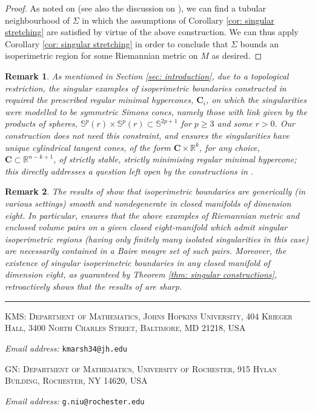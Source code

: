 \documentclass[12pt]{article}
\makeatletter
\newtheorem{remark}{Remark}
\newcommand{\Addresses}{{
  \bigskip
  \footnotesize

KMS:
\textsc{Department of Mathematics, Johns Hopkins University, 404 Krieger Hall, 3400 North Charles Street, Baltimore, MD 21218, USA}\par\nopagebreak
  \textit{Email address:} \texttt{kmarsh34@jh.edu}

\bigskip

GN:
\textsc{Department of Mathematics, University of Rochester, 915 Hylan Building, Rochester, NY 14620, USA}\par\nopagebreak
  \textit{Email address:} \texttt{g.niu@rochester.edu}

}}
\makeatother
\begin{document}
\begin{proof}
\bigskip

As noted on \cite[Pages 2323-2324]{S00} (see also the discussion on \cite[Pages 168-169]{S99}), we can find a tubular neighbourhood of $\Sigma$ in which the assumptions of Corollary \ref{cor: singular stretching} are satisfied by virtue of the above construction. We can thus apply Corollary \ref{cor: singular stretching} in order to conclude that $\Sigma$ bounds an isoperimetric region for some Riemannian metric on $M$ as desired.
\end{proof}

\begin{remark}\label{rem: cones}
    As mentioned in Section \ref{sec: introduction}, due to a topological restriction, the singular examples of isoperimetric boundaries constructed in \cite{N24} required the prescribed regular minimal hypercones, $\mathbf{C}_i$, on which the singularities were modelled to be symmetric Simons cones, namely those with link given by the products of spheres, $\mathbb{S}^p(r)\times \mathbb{S}^p(r)\subset \mathbb{S}^{2p+1}$ for $p\ge3$ and some $r>0$. Our construction does not need this constraint, and ensures the singularities have unique cylindrical tangent cones, of the form $\mathbf{C}\times \mathbb{R}^k$, for any choice, $\mathbf{C} \subset \mathbb{R}^{n - k + 1}$, of strictly stable, strictly minimising regular minimal hypercone; this directly addresses a question left open by the constructions in \cite{N24}.
\end{remark}

\begin{remark}
    The results of \cite{MNP25} show that isoperimetric boundaries are generically (in various settings) smooth and nondegenerate in closed manifolds of dimension eight. In particular, \cite[Theorem 1]{MNP25} ensures that the above examples of Riemannian metric and enclosed volume pairs on a given closed eight-manifold which admit singular isoperimetric regions (having only finitely many isolated singularities in this case) are necessarily contained in a Baire meagre set of such pairs. Moreover, the existence of singular isoperimetric boundaries in any closed manifold of dimension eight, as guaranteed by Theorem \ref{thm: singular constructions}, retroactively shows that the results of \cite{MNP25} are sharp.
\end{remark}




\hrule
\Addresses
\end{document}
